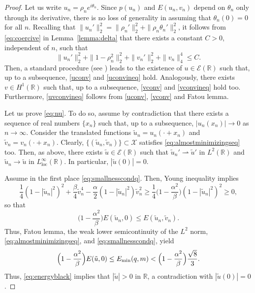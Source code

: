 \documentclass[11pt]{article}
\newcommand{\R}{\mathbb{R}}
\newcommand{\boE}{\mathcal{E}}
\newcommand{\boX}{\mathcal{X}}
\newcommand{\Emin}{E_\textup{min}}
\newcommand{\loc}{\operatorname{loc}}
\theoremstyle{plain}
\theoremstyle{definition}
\theoremstyle{remark}
\numberwithin{equation}{section}
\begin{document}
{\begin{proof}
Let us write $u_n=\rho_n e^{i\theta_n}$. Since $p(u_n)$ and $E(u_n,v_n)$ depend on $\theta_n$ only through its derivative, there is no loss of generality in assuming that $\theta_n(0)=0$ for all $n$. Recalling that $\|u_n'\|_2^2=\|\rho_n'\|_2^2+\|\rho_n\theta_n'\|_2^2$, it follows from \eqref{eq:coercive} in Lemma~\ref{lemma:delta} that there exists a constant $C>0$, independent of $n$, such that
    \begin{equation}\label{proof:generalest}
	\|u_n'\|_2^2+\|1-\rho_n^2\|_2^2+\|v_n'\|_2^2+\|v_n\|_4^4\leq C.
	\end{equation}
Then, a standard procedure (see \cite{bethuel0,delaire-mennuni}) leads to the existence of $u\in \boE(\R)$ such that, up to a subsequence, \eqref{uconv} and \eqref{uconvineq} hold. Analogously, there exists $v\in H^1(\R)$ such that, up to a subsequence, \eqref{vconv} and \eqref{vconvineq} hold too. Furthermore, \eqref{uvconvineq} follows from \eqref{uconv}, \eqref{vconv} and Fatou lemma.

Let us prove \eqref{eq:nu}. To do so, assume by contradiction that there exists a sequence of real numbers $\{x_n\}$ such that, up to a subsequence, $|u_n(x_n)|\to 0$ as $n\to\infty$. Consider the translated functions $\tilde u_n=u_n(\cdot+x_n)$ and $\tilde v_n=v_n(\cdot+x_n)$. Clearly, $\{(\tilde u_n,\tilde v_n)\}\subset\boX$ satisfies \eqref{eq:almostminimizingseq} too. Then, as above, there exists $\tilde u\in\boE(\R)$ such that $\tilde u_n'\rightharpoonup\tilde u'$ in $L^2(\R)$ and $\tilde u_n\to\tilde u$ in $L^\infty_{\loc}(\R)$. In particular, $|\tilde u(0)|=0$. 

Assume in the first place \eqref{eq:smallnesscondq}. Then, Young inequality implies
\begin{equation}\label{eq:young}
\frac14(1-|\tilde u_n|^2)^2 + \frac{\beta}{4}\tilde v_n^4 -\frac{\alpha}{2}(1-|\tilde u_n|^2)\tilde v_n^2 \geq \frac14\Big(1-\frac{\alpha^2}{\beta}\Big)(1-|\tilde u_n|^2)^2 \geq 0,
\end{equation}
so that 
\[\Big(1-\frac{\alpha^2}{\beta}\Big)E(\tilde u_n,0)\leq E(\tilde u_n,\tilde v_n).\]
Thus,  Fatou lemma, the weak lower semicontinuity of the $L^2$ norm, \eqref{eq:almostminimizingseq}, and \eqref{eq:smallnesscondq}, yield
\[\Big(1-\frac{\alpha^2}{\beta}\Big)E(\tilde u,0)\leq \Emin(q,m)< \Big(1-\frac{\alpha^2}{\beta}\Big)\frac{\sqrt{8}}{3}.\]
Thus, \eqref{eq:energyblack} implies that $|\tilde u|>0$ in $\R$, a contradiction with $|\tilde u(0)|=0$.


\end{proof}}
\end{document}

